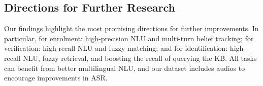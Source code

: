 \documentclass[11pt]{article}
\begin{document}
{ 
\subsection{Directions for Further Research}
\vspace{-0.5mm}
Our findings highlight the most promising directions for further improvements.
In particular,
for enrolment: high-precision NLU and multi-turn belief tracking;
for verification: high-recall NLU and fuzzy matching;
and for identification: high-recall NLU, fuzzy retrieval, and boosting the recall of querying the KB.
All tasks can benefit from better multilingual NLU, and our dataset includes audios to encourage improvements in ASR.

\vspace{-0.5mm}

\begin{table}[t]
\def\arraystretch{0.87}
\begin{center}
\end{center}
\caption{Identification task with a \texttt{KB oracle}.}
\label{tab:results_kb_oracle}
\end{table}
  
}
\end{document}
